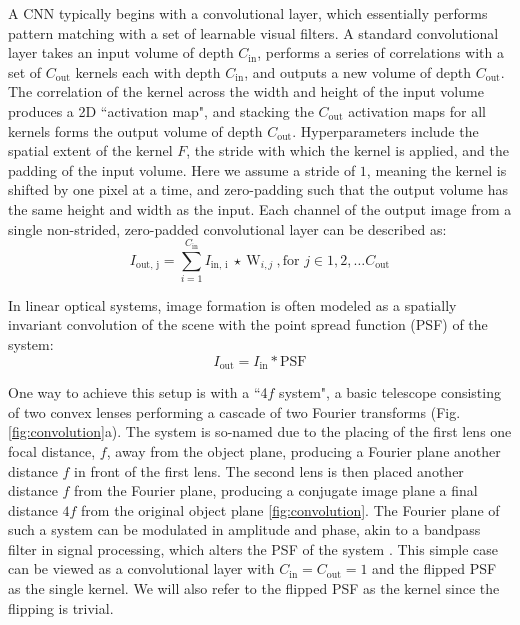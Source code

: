 A CNN typically begins with a convolutional layer, which essentially performs pattern matching with a set of learnable visual filters. A standard convolutional layer takes an input volume of depth $C_\text{in}$, performs a series of correlations with a set of $C_\text{out}$ kernels each with depth $C_\text{in}$, and outputs a new volume of depth $C_\text{out}$. The correlation of the kernel across the width and height of the input volume produces a 2D ``activation map", and stacking the $C_\text{out}$ activation maps for all kernels forms the output volume of depth $C_\text{out}$. Hyperparameters include the spatial extent of the kernel $F$, the stride with which the kernel is applied, and the padding of the input volume. Here we assume a stride of $1$, meaning the kernel is shifted by one pixel at a time, and zero-padding such that the output volume has the same height and width as the input. Each channel of the output image from a single non-strided, zero-padded convolutional layer can be described as:
\begin{equation}
I_\text{out, j}  = \sum_{i = 1}^{C_\text{in}} I_\text{in, i} \ \star \ \text{W}_{i,j}\ , \text{for } j \in 1, 2, \hdots C_\text{out} 
\end{equation}

In linear optical systems, image formation is often modeled as a spatially invariant convolution of the scene with the point spread function (PSF) of the system:
\begin{equation}
I_\text{out}  = I_\text{in} * \text{PSF}
\end{equation}

One way to achieve this setup is with a ``4$f$ system", a basic telescope consisting of two convex lenses performing a cascade of two Fourier transforms (Fig. \ref{fig:convolution}a). The system is so-named due to the placing of the first lens one focal distance, $f$, away from the object plane, producing a Fourier plane another distance $f$ in front of the first lens. The second lens is then placed another distance $f$ from the Fourier plane, producing a conjugate image plane a final distance $4f$ from the original object plane \ref{fig:convolution}. The Fourier plane of such a system can be modulated in amplitude and phase, akin to a bandpass filter in signal processing, which alters the PSF of the system \cite{goodman2008introduction}.  This simple case can be viewed as a convolutional layer with $C_\text{in} = C_\text{out} = 1$ and the flipped PSF as the single kernel. We will also refer to the flipped PSF as the kernel since the flipping is trivial. 

